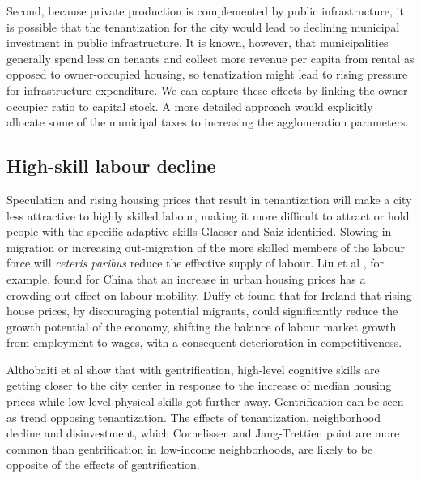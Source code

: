Second, because private production is complemented by public infrastructure, it is possible that the tenantization for the city would lead to declining municipal investment in public infrastructure. It is known, however, that municipalities generally spend less on tenants and collect more revenue per capita from rental as opposed to owner-occupied housing, so tenatization might lead to rising pressure for infrastructure expenditure.  We can capture these effects by linking the owner-occupier ratio to capital stock. A more detailed approach would explicitly allocate some of the municipal taxes to increasing the agglomeration parameters.


\subsection{High-skill labour decline}

 Speculation and rising housing prices that result in tenantization will make a city less attractive to highly skilled labour, making it more difficult to attract or hold people with the specific adaptive skills Glaeser and Saiz \cite{glaeserRiseSkilledCity2003} identified. Slowing in-migration or increasing out-migration of the more skilled members of the labour force  will \textit{ceteris paribus} reduce the effective supply of labour. 
Liu et al \cite{liuImpactUrbanHousing2023}, for example, found for China that an increase in urban housing prices has a crowding-out effect on labour mobility.  Duffy et  \cite{duffyRisingHousePrices2005} found that for Ireland that rising house prices, by discouraging potential migrants, could significantly reduce the growth potential of the economy, shifting the balance of labour market growth from employment to wages, with a consequent deterioration in competitiveness. %

Althobaiti et al \cite{althobaitiHousingPricesSkills2021}  show that with gentrification, high-level cognitive skills are getting closer to the city center in response to the increase of median housing prices while low-level physical skills got further away.  Gentrification can be seen as trend opposing tenantization. The effects of tenantization, neighborhood decline and disinvestment, which Cornelissen and Jang-Trettien \cite{cornelissenHousingContextNeighborhood2023} point are more common than gentrification in low-income neighborhoods, are likely to be opposite of the effects of gentrification.

